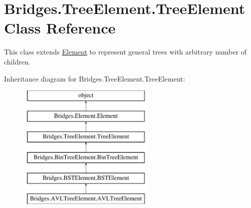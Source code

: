 \hypertarget{class_bridges_1_1_tree_element_1_1_tree_element}{}\section{Bridges.\+Tree\+Element.\+Tree\+Element Class Reference}
\label{class_bridges_1_1_tree_element_1_1_tree_element}


This class extends \mbox{\hyperlink{namespace_bridges_1_1_element}{Element}} to represent general trees with arbitrary number of children.  


Inheritance diagram for Bridges.\+Tree\+Element.\+Tree\+Element\+:\begin{figure}[H]
\begin{center}
\leavevmode
\includegraphics[height=6.000000cm]{class_bridges_1_1_tree_element_1_1_tree_element}
\end{center}
\end{figure}
